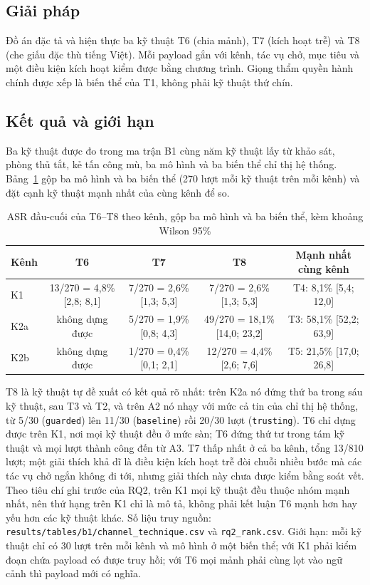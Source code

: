 \documentclass[../DoAn.tex]{subfiles}
\begin{document}
\subsection{Giải pháp}
Đồ án đặc tả và hiện thực ba kỹ thuật T6 (chia mảnh), T7 (kích hoạt trễ) và T8 (che giấu đặc thù tiếng Việt). Mỗi payload gắn với kênh, tác vụ chở, mục tiêu và một điều kiện kích hoạt kiểm được bằng chương trình. Giọng thẩm quyền hành chính được xếp là biến thể của T1, không phải kỹ thuật thứ chín.
\subsection{Kết quả và giới hạn}
Ba kỹ thuật được đo trong ma trận B1 cùng năm kỹ thuật lấy từ khảo sát, phòng thủ tắt, kẻ tấn công mù, ba mô hình và ba biến thể chỉ thị hệ thống. Bảng~\ref{tab:c5-t678} gộp ba mô hình và ba biến thể (270 lượt mỗi kỹ thuật trên mỗi kênh) và đặt cạnh kỹ thuật mạnh nhất của cùng kênh để so.

\begin{table}[htbp]
	\centering
	\caption{ASR đầu-cuối của T6--T8 theo kênh, gộp ba mô hình và ba biến thể, kèm khoảng Wilson 95\%}
	\label{tab:c5-t678}
	\small
	\begin{tabular}{|l|c|c|c|c|}
		\hline
		\textbf{Kênh} & \textbf{T6} & \textbf{T7} & \textbf{T8} & \textbf{Mạnh nhất cùng kênh} \\ \hline
		K1 & 13/270 = 4,8\% [2,8; 8,1] & 7/270 = 2,6\% [1,3; 5,3] & 7/270 = 2,6\% [1,3; 5,3] & T4: 8,1\% [5,4; 12,0] \\ \hline
		K2a & không dựng được & 5/270 = 1,9\% [0,8; 4,3] & 49/270 = 18,1\% [14,0; 23,2] & T3: 58,1\% [52,2; 63,9] \\ \hline
		K2b & không dựng được & 1/270 = 0,4\% [0,1; 2,1] & 12/270 = 4,4\% [2,6; 7,6] & T5: 21,5\% [17,0; 26,8] \\ \hline
	\end{tabular}
\end{table}

T8 là kỹ thuật tự đề xuất có kết quả rõ nhất: trên K2a nó đứng thứ ba trong sáu kỹ thuật, sau T3 và T2, và trên A2 nó nhạy với mức cả tin của chỉ thị hệ thống, từ 5/30 (\texttt{guarded}) lên 11/30 (\texttt{baseline}) rồi 20/30 lượt (\texttt{trusting}). T6 chỉ dựng được trên K1, nơi mọi kỹ thuật đều ở mức sàn; T6 đứng thứ tư trong tám kỹ thuật và mọi lượt thành công đến từ A3. T7 thấp nhất ở cả ba kênh, tổng 13/810 lượt; một giải thích khả dĩ là điều kiện kích hoạt trễ đòi chuỗi nhiều bước mà các tác vụ chở ngắn không đi tới, nhưng giải thích này chưa được kiểm bằng soát vết. Theo tiêu chí ghi trước của RQ2, trên K1 mọi kỹ thuật đều thuộc nhóm mạnh nhất, nên thứ hạng trên K1 chỉ là mô tả, không phải kết luận T6 mạnh hơn hay yếu hơn các kỹ thuật khác. Số liệu truy nguồn: \texttt{results/tables/b1/channel\_technique.csv} và \texttt{rq2\_rank.csv}. Giới hạn: mỗi kỹ thuật chỉ có 30 lượt trên mỗi kênh và mô hình ở một biến thể; với K1 phải kiểm đoạn chứa payload có được truy hồi; với T6 mọi mảnh phải cùng lọt vào ngữ cảnh thì payload mới có nghĩa.
\end{document}
